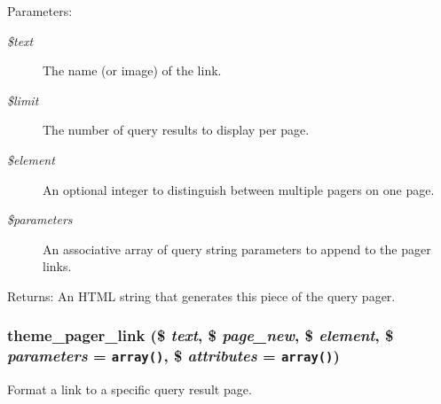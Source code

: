 \begin{Desc}
\item[Parameters:]
\begin{description}
\item[{\em \$text}]The name (or image) of the link. \item[{\em \$limit}]The number of query results to display per page. \item[{\em \$element}]An optional integer to distinguish between multiple pagers on one page. \item[{\em \$parameters}]An associative array of query string parameters to append to the pager links. \end{description}
\end{Desc}
\begin{Desc}
\item[Returns:]An HTML string that generates this piece of the query pager. \end{Desc}
\hypertarget{group__themeable_gecd911fe0400d240d1b93298cb83f07e}{
\subsubsection[{theme\_\-pager\_\-link}]{\setlength{\rightskip}{0pt plus 5cm}theme\_\-pager\_\-link (\$ {\em text}, \/  \$ {\em page\_\-new}, \/  \$ {\em element}, \/  \$ {\em parameters} = {\tt array()}, \/  \$ {\em attributes} = {\tt array()})}}
\label{group__themeable_gecd911fe0400d240d1b93298cb83f07e}


Format a link to a specific query result page.

